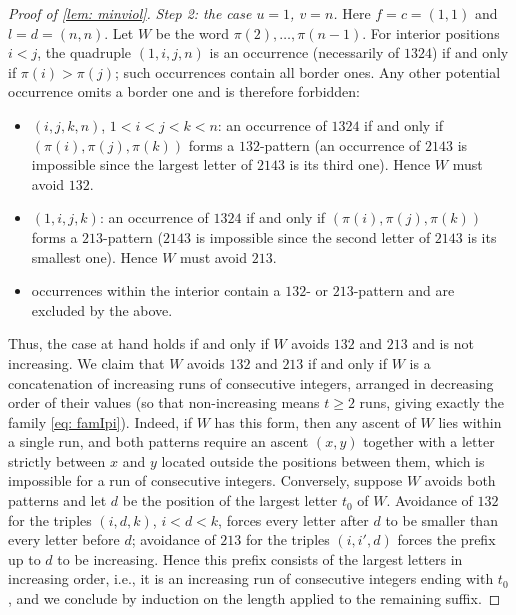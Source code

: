 \documentclass[12pt]{article}
\begin{document}
\begin{proof}[Proof of \cref{lem: minviol}]
\emph{Step 2: the case $u=1$, $v=n$.}
Here $f=c=(1,1)$ and $l=d=(n,n)$. Let $W$ be the word $\pi(2),\dots,\pi(n-1)$.
For interior positions $i<j$, the quadruple $(1,i,j,n)$ is an occurrence (necessarily of $1324$) if and only if
$\pi(i)>\pi(j)$; such occurrences contain all border ones. Any other potential occurrence omits a border one and is
therefore forbidden:
\begin{itemize}
\item $(i,j,k,n)$, $1<i<j<k<n$: an occurrence of $1324$ if and only if $(\pi(i),\pi(j),\pi(k))$ forms a
$132$-pattern (an occurrence of $2143$ is impossible since the largest letter of $2143$ is its third one).
Hence $W$ must avoid $132$.
\item $(1,i,j,k)$: an occurrence of $1324$ if and only if $(\pi(i),\pi(j),\pi(k))$ forms a $213$-pattern
($2143$ is impossible since the second letter of $2143$ is its smallest one). Hence $W$ must avoid $213$.
\item occurrences within the interior contain a $132$- or $213$-pattern and are excluded by the above.
\end{itemize}
Thus, the case at hand holds if and only if $W$ avoids $132$ and $213$ and is not increasing.
We claim that $W$ avoids $132$ and $213$ if and only if $W$ is a concatenation of increasing runs of consecutive
integers, arranged in decreasing order of their values (so that non-increasing means $t\ge2$ runs, giving exactly the
family \cref{eq: famIpi}). Indeed, if $W$ has this form, then any ascent of $W$ lies within a single run, and both
patterns require an ascent $(x,y)$ together with a letter strictly between $x$ and $y$ located outside the positions
between them, which is impossible for a run of consecutive integers. Conversely, suppose $W$ avoids both patterns and
let $d$ be the position of the largest letter $t_0$ of $W$. Avoidance of $132$ for the triples $(i,d,k)$, $i<d<k$,
forces every letter after $d$ to be smaller than every letter before $d$; avoidance of $213$ for the triples
$(i,i',d)$ forces the prefix up to $d$ to be increasing. Hence this prefix consists of the largest letters in
increasing order, i.e., it is an increasing run of consecutive integers ending with $t_0$, and we conclude by
induction on the length applied to the remaining suffix.


\end{proof}
\end{document}
